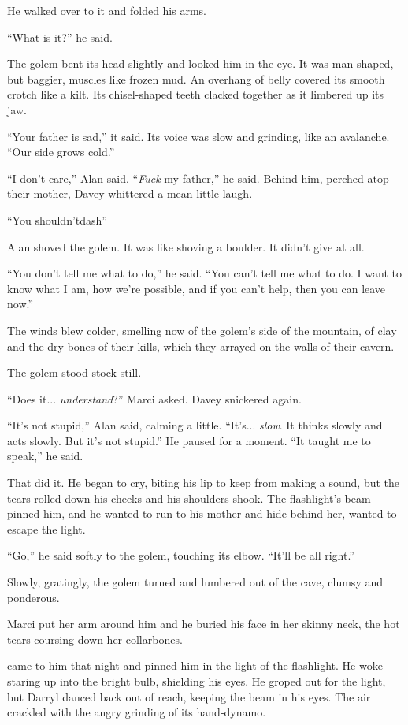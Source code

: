 He walked over to it and folded his arms.

``What is it?'' he said.

The golem bent its head slightly and looked him in the eye.  It was
man-shaped, but baggier, muscles like frozen mud.  An overhang of
belly covered its smooth crotch like a kilt.  Its chisel-shaped teeth
clacked together as it limbered up its jaw.

``Your father is sad,'' it said.  Its voice was slow and grinding,
like an avalanche.  ``Our side grows cold.''

``I don't care,'' Alan said.  ``\textit{Fuck} my father,'' he said. 
Behind him, perched atop their mother, Davey whittered a mean little
laugh.

``You shouldn'tdash{}''

Alan shoved the golem.  It was like shoving a boulder.  It didn't give
at all.

``You don't tell me what to do,'' he said.  ``You can't tell me what
to do.  I want to know what I am, how we're possible, and if you can't
help, then you can leave now.''

The winds blew colder, smelling now of the golem's side of the
mountain, of clay and the dry bones of their kills, which they arrayed
on the walls of their cavern.

The golem stood stock still.

``Does it...  \textit{understand}?'' Marci asked.  Davey snickered
again.

``It's not stupid,'' Alan said, calming a little.  ``It's... 
\textit{slow}.  It thinks slowly and acts slowly.  But it's not
stupid.'' He paused for a moment.  ``It taught me to speak,'' he said.

That did it.  He began to cry, biting his lip to keep from making a
sound, but the tears rolled down his cheeks and his shoulders shook. 
The flashlight's beam pinned him, and he wanted to run to his mother
and hide behind her, wanted to escape the light.

``Go,'' he said softly to the golem, touching its elbow.  ``It'll be
all right.''

Slowly, gratingly, the golem turned and lumbered out of the cave,
clumsy and ponderous.

Marci put her arm around him and he buried his face in her skinny
neck, the hot tears coursing down her collarbones.

 came to him that night and pinned him in the light of the
flashlight.  He woke staring up into the bright bulb, shielding his
eyes.  He groped out for the light, but Darryl danced back out of
reach, keeping the beam in his eyes.  The air crackled with the angry
grinding of its hand-dynamo.

